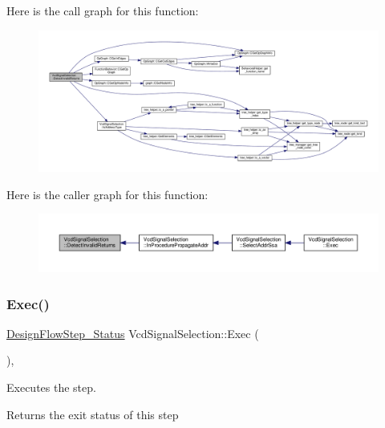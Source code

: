 Here is the call graph for this function\+:
\nopagebreak
\begin{figure}[H]
\begin{center}
\leavevmode
\includegraphics[width=350pt]{dd/de4/classVcdSignalSelection_a632534f4dfe6c520a1736d508c25c1a1_cgraph}
\end{center}
\end{figure}
Here is the caller graph for this function\+:
\nopagebreak
\begin{figure}[H]
\begin{center}
\leavevmode
\includegraphics[width=350pt]{dd/de4/classVcdSignalSelection_a632534f4dfe6c520a1736d508c25c1a1_icgraph}
\end{center}
\end{figure}
\mbox{\label{classVcdSignalSelection_a330bc0d127f30a23cb4c8224855f0c27}} 
\subsubsection{\texorpdfstring{Exec()}{Exec()}}
{\footnotesize\ttfamily \hyperlink{design__flow__step_8hpp_afb1f0d73069c26076b8d31dbc8ebecdf}{Design\+Flow\+Step\+\_\+\+Status} Vcd\+Signal\+Selection\+::\+Exec (\begin{DoxyParamCaption}{ }\end{DoxyParamCaption})\hspace{0.3cm}{\ttfamily [override]}, {\ttfamily [virtual]}}



Executes the step. 

\begin{DoxyReturn}{Returns}
the exit status of this step 
\end{DoxyReturn}


